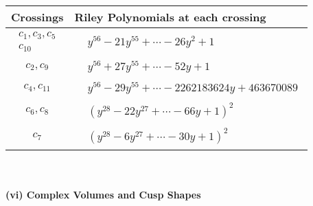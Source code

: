 \documentclass[1p]{elsarticle_modified}
\theoremstyle{definition}
\begin{document}
\begin{tabular}{m{50pt}|m{274pt}}
Crossings & \hspace{64pt}Riley Polynomials at each crossing \\
\hline $$\begin{aligned}c_{1},c_{3},c_{5}\\c_{10}\end{aligned}$$&$\begin{aligned}
&y^{56}-21 y^{55}+\cdots-26 y^2+1
\end{aligned}$\\
\hline $$\begin{aligned}c_{2},c_{9}\end{aligned}$$&$\begin{aligned}
&y^{56}+27 y^{55}+\cdots-52 y+1
\end{aligned}$\\
\hline $$\begin{aligned}c_{4},c_{11}\end{aligned}$$&$\begin{aligned}
&y^{56}-29 y^{55}+\cdots-2262183624 y+463670089
\end{aligned}$\\
\hline $$\begin{aligned}c_{6},c_{8}\end{aligned}$$&$\begin{aligned}
&(y^{28}-22 y^{27}+\cdots-66 y+1)^{2}
\end{aligned}$\\
\hline $$\begin{aligned}c_{7}\end{aligned}$$&$\begin{aligned}
&(y^{28}-6 y^{27}+\cdots-30 y+1)^{2}
\end{aligned}$\\
\hline
\end{tabular}\\~\\
\newpage\flushleft \textbf{(vi) Complex Volumes and Cusp Shapes}
\end{document}
